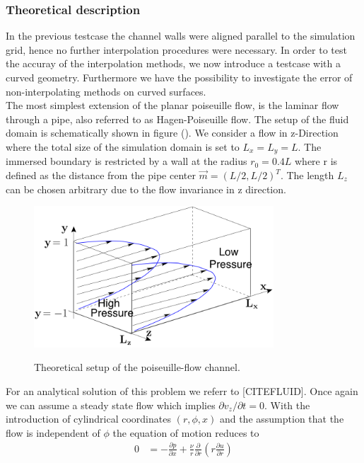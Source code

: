 \subsubsection{Theoretical description}

In the previous testcase the channel walls were aligned parallel to the simulation grid, hence no further interpolation procedures
were necessary. In order to test the accuray of the interpolation methods, we now introduce a testcase with a curved geometry.
Furthermore we have the possibility to investigate the error of non-interpolating methods on curved surfaces.\\
The most simplest extension of the planar poiseuille flow, is the laminar flow through a pipe,
also referred to as Hagen-Poiseuille flow. The setup of the fluid domain is schematically shown in figure ().
We consider a flow in z-Direction where the total size of the simulation domain is set to $L_x = L_y = L$.
The immersed boundary is restricted by a wall at the radius $r_0=0.4L$ where r is defined as the distance from the pipe center $\vec{m} = (L/2, L/2)^T$.
The length $L_z$ can be chosen arbitrary due to the flow invariance in z direction.\\
\begin{figure}[!bp]
  \centering
  \includegraphics[width=0.8\textwidth]{gfx/immersed_boundary/val_volpen/poiseuilleflow.png}\label{b}
  \caption{Theoretical setup of the poiseuille-flow channel.}
\end{figure}
For an analytical solution of this problem we referr to [CITEFLUID].
Once again we can assume a steady state flow which implies $\partial v_z/\partial t = 0$. With the introduction of cylindrical coordinates $(r, \phi, x)$
and the assumption that the flow is independent of $\phi$ the equation of motion reduces to
\begin{align}
        0 &= - \frac{\partial p}{\partial x}  +  \frac{\nu}{r}\frac{\partial}{\partial r}\left(r\frac{\partial u}{\partial r}\right)
\end{align}
